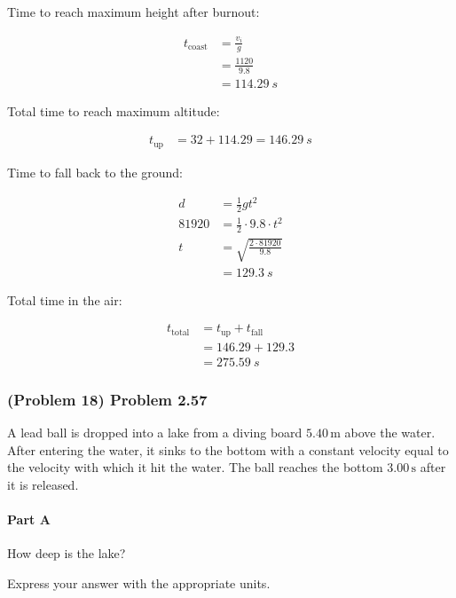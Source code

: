 \begin{solution}
	Time to reach maximum height after burnout:

	\begin{align*}
		t_{\mathrm{coast}} &= \frac{v_i}{g} \\
		&= \frac{1120}{9.8} \\
		&= \SI{114.29}{s}
	\end{align*}

	Total time to reach maximum altitude:

	\begin{align*}
		t_{\mathrm{up}} &= 32 + 114.29 = \SI{146.29}{s}
	\end{align*}

	Time to fall back to the ground:

	\begin{align*}
		d &= \frac{1}{2} g t^2 \\
		81920 &= \frac{1}{2} \cdot 9.8 \cdot t^2 \\
		t &= \sqrt{\frac{2 \cdot 81920}{9.8}} \\
		&= \SI{129.3}{s}
	\end{align*}

	Total time in the air:

	\begin{align*}
		t_{\mathrm{total}} &= t_{\mathrm{up}} + t_{\mathrm{fall}} \\
		&= 146.29 + 129.3 \\
		&= \boxed{\SI{275.59}{s}}
	\end{align*}
\end{solution}

\newpage

\subsubsection{(Problem 18) Problem 2.57}

A lead ball is dropped into a lake from a diving board \( 5.40 \, \mathrm{m} \) above the water. After entering the water, it sinks to the bottom with a constant velocity equal to the velocity with which it hit the water. The ball reaches the bottom \( 3.00 \, \mathrm{s} \) after it is released.

\paragraph{Part A}
How deep is the lake?

Express your answer with the appropriate units.

